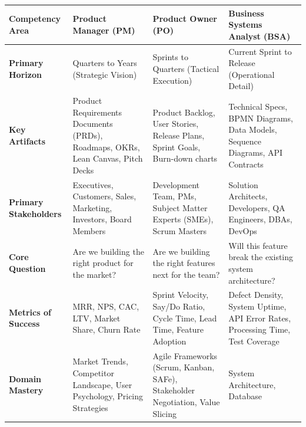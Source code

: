 \documentclass[
  11pt,
  openany,
  oneside]{book}
\begin{document}
\begin{longtable}[]{@{}
  >{\raggedright\arraybackslash}p{}
  >{\raggedright\arraybackslash}p{}
  >{\raggedright\arraybackslash}p{}
  >{\raggedright\arraybackslash}p{}@{}}
\toprule\noalign{}
\begin{minipage}[b]{\linewidth}\raggedright
Competency Area
\end{minipage} & \begin{minipage}[b]{\linewidth}\raggedright
Product Manager (PM)
\end{minipage} & \begin{minipage}[b]{\linewidth}\raggedright
Product Owner (PO)
\end{minipage} & \begin{minipage}[b]{\linewidth}\raggedright
Business Systems Analyst (BSA)
\end{minipage} \\
\midrule\noalign{}
\endhead
\bottomrule\noalign{}
\endlastfoot
\textbf{Primary Horizon} & Quarters to Years (Strategic Vision) &
Sprints to Quarters (Tactical Execution) & Current Sprint to Release
(Operational Detail) \\
\textbf{Key Artifacts} & Product Requirements Documents (PRDs),
Roadmaps, OKRs, Lean Canvas, Pitch Decks & Product Backlog, User
Stories, Release Plans, Sprint Goals, Burn-down charts & Technical
Specs, BPMN Diagrams, Data Models, Sequence Diagrams, API Contracts \\
\textbf{Primary Stakeholders} & Executives, Customers, Sales, Marketing,
Investors, Board Members & Development Team, PMs, Subject Matter Experts
(SMEs), Scrum Masters & Solution Architects, Developers, QA Engineers,
DBAs, DevOps \\
\textbf{Core Question} & Are we building the right product for the
market? & Are we building the right features next for the team? & Will
this feature break the existing system architecture? \\
\textbf{Metrics of Success} & MRR, NPS, CAC, LTV, Market Share, Churn
Rate & Sprint Velocity, Say/Do Ratio, Cycle Time, Lead Time, Feature
Adoption & Defect Density, System Uptime, API Error Rates, Processing
Time, Test Coverage \\
\textbf{Domain Mastery} & Market Trends, Competitor Landscape, User
Psychology, Pricing Strategies & Agile Frameworks (Scrum, Kanban, SAFe),
Stakeholder Negotiation, Value Slicing & System Architecture, Database

\end{longtable}
\end{document}
